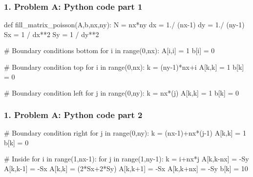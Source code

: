\begin{frame}[fragile]
	\frametitle{\textbf{1. Problem A: Python code part 1}}


\begin{PYTHON}
def fill_matrix_poisson(A,b,nx,ny):
  N = nx*ny
  dx = 1./ (nx-1)
  dy = 1./ (ny-1)
  Sx = 1 / dx**2
  Sy = 1 / dy**2
  
  # Boundary conditions bottom
  for i in range(0,nx):
    A[i,i] = 1
    b[i] = 0
  
  # Boundary condition top
  for i in range(0,nx):
    k = (ny-1)*nx+i
    A[k,k] = 1
    b[k] = 0
  
  # Boundary condition left
  for j in range(0,ny):
    k = nx*(j)
    A[k,k] = 1
    b[k] = 0

\end{PYTHON}

\end{frame}

\begin{frame}[fragile]
	\frametitle{\textbf{1. Problem A: Python code part 2}}
	
	
	\begin{PYTHON}

# Boundary condition right
for j in range(0,ny):
  k = (nx-1)+nx*(j-1)
  A[k,k] = 1
  b[k] = 0      

# Inside
for i in range(1,nx-1):
  for j in range(1,ny-1):
    k = i+nx*j
    A[k,k-nx] = -Sy
    A[k,k-1] = -Sx
    A[k,k] = (2*Sx+2*Sy)
    A[k,k+1] = -Sx
    A[k,k+nx] = -Sy
    b[k] = 10
\end{PYTHON}
	
\end{frame}

